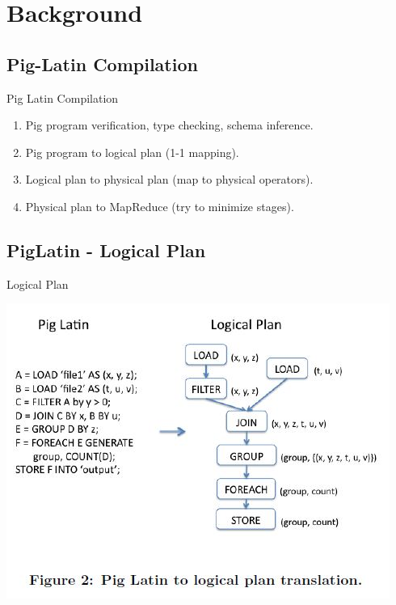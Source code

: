 \section{Background}

\subsection{Pig-Latin Compilation}
\begin{frame}{Pig Latin Compilation}
\begin{enumerate}
	\item Pig program verification, type checking, schema inference.
	\item Pig program to logical plan (1-1 mapping).
	\item Logical plan to physical plan (map to physical operators).
	\item Physical plan to MapReduce (try to minimize stages).
\end{enumerate}
\end{frame}

\subsection{PigLatin - Logical Plan}
\begin{frame}{Logical Plan}
\centerline{\includegraphics[scale=0.55]{Images/PigLatin.JPG}}
\let\thefootnote\relax{}
\end{frame}

